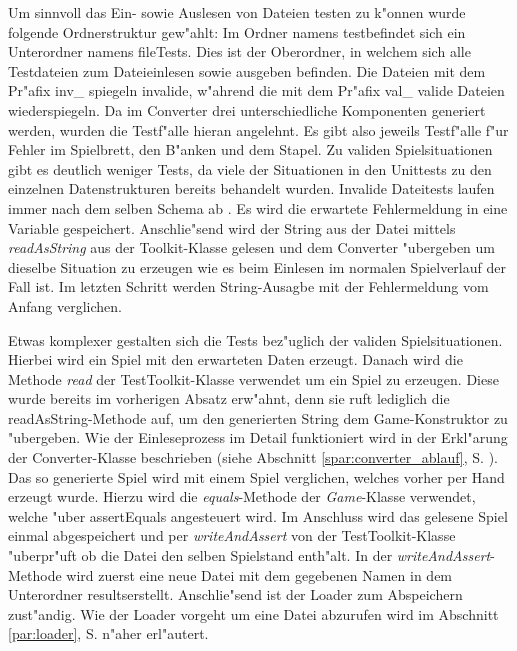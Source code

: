 Um sinnvoll das Ein- sowie Auslesen von Dateien testen zu k"onnen wurde folgende Ordnerstruktur gew"ahlt: Im Ordner namens \glqq test\grqq befindet sich ein Unterordner namens \glqq fileTests\grqq {}. Dies ist der Oberordner, in welchem sich alle Testdateien zum Dateieinlesen sowie ausgeben befinden. Die Dateien mit dem Pr"afix \glqq inv\_\grqq {} spiegeln invalide, w"ahrend die mit dem Pr"afix \glqq val\_\grqq {} valide Dateien wiederspiegeln. Da im Converter drei unterschiedliche Komponenten generiert werden, wurden die Testf"alle hieran angelehnt. Es gibt also jeweils Testf"alle f"ur Fehler im Spielbrett, den B"anken und dem Stapel. Zu validen Spielsituationen gibt es deutlich weniger Tests, da viele der Situationen in den Unittests zu den einzelnen Datenstrukturen bereits behandelt wurden. Invalide Dateitests laufen immer nach dem selben Schema ab . Es wird die erwartete Fehlermeldung in eine Variable gespeichert. Anschlie"send wird der String aus der Datei mittels \emph{readAsString} aus der Toolkit-Klasse gelesen und dem Converter "ubergeben um dieselbe Situation zu erzeugen wie es beim Einlesen im normalen Spielverlauf der Fall ist. Im letzten Schritt werden String-Ausagbe mit der Fehlermeldung vom Anfang verglichen. 

Etwas komplexer gestalten sich die Tests bez"uglich der validen Spielsituationen. Hierbei wird ein Spiel mit den erwarteten Daten erzeugt. Danach wird die Methode \emph{read} der TestToolkit-Klasse verwendet um ein Spiel zu erzeugen. Diese wurde bereits im vorherigen Absatz erw"ahnt, denn sie ruft lediglich die readAsString-Methode auf, um den generierten String dem Game-Konstruktor zu "ubergeben. Wie der Einleseprozess im Detail funktioniert wird in der Erkl"arung der Converter-Klasse beschrieben (siehe Abschnitt \ref{spar:converter_ablauf}, S. \pageref{spar:converter_ablauf}). Das so generierte Spiel wird mit einem Spiel verglichen, welches vorher \glqq per Hand\grqq {} erzeugt wurde. Hierzu wird die \emph{equals}-Methode der \emph{Game}-Klasse verwendet, welche "uber assertEquals angesteuert wird. Im Anschluss wird das gelesene Spiel einmal abgespeichert und per \emph{writeAndAssert} von der TestToolkit-Klasse "uberpr"uft ob die Datei den selben Spielstand enth"alt. In der \emph{writeAndAssert}-Methode wird zuerst eine neue Datei mit dem gegebenen Namen in dem Unterordner \glqq results\grqq  erstellt. Anschlie"send ist der Loader zum Abspeichern zust"andig. Wie der Loader vorgeht um eine Datei abzurufen wird im Abschnitt \ref{par:loader}, S. \pageref{par:loader} n"aher erl"autert. 

